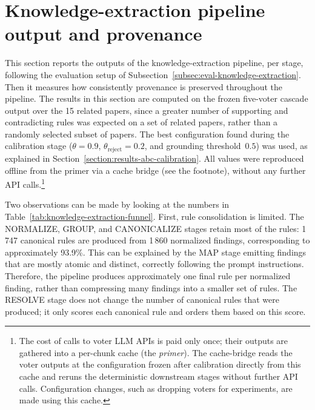 \section{Knowledge-extraction pipeline output and provenance}\label{section:results-ke-pipeline-output-and-provenance}

This section reports the outputs of the knowledge-extraction pipeline, per stage, following the evaluation setup of Subsection~\ref{subsec:eval-knowledge-extraction}. Then it measures how consistently provenance is preserved throughout the pipeline. The results in this section are computed on the frozen five-voter cascade output over the 15 related papers, since a greater number of supporting and contradicting rules was expected on a set of related papers, rather than a randomly selected subset of papers. The best configuration found during the calibration stage ($\theta = 0.9$, $\theta_{\mathrm{reject}} = 0.2$, and grounding threshold~$0.5$) was used, as explained in Section~\ref{section:results-abc-calibration}. All values were reproduced offline from the primer via a cache bridge (see the footnote), without any further API calls.\footnote{
The cost of calls to voter LLM APIs is paid only once; their outputs are gathered into a per-chunk cache (the \emph{primer}). The cache-bridge reads the voter outputs at the configuration frozen after calibration directly from this cache and reruns the deterministic downstream stages without further API calls. Configuration changes, such as dropping voters for experiments, are made using this cache.}

Two observations can be made by looking at the numbers in Table~\ref{tab:knowledge-extraction-funnel}. First, rule consolidation is limited. The NORMALIZE, GROUP, and CANONICALIZE stages retain most of the rules: 1\,747 canonical rules are produced from 1\,860 normalized findings, corresponding to approximately 93.9\%. This can be explained by the MAP stage emitting findings that are mostly atomic and distinct, correctly following the prompt instructions. Therefore, the pipeline produces approximately one final rule per normalized finding, rather than compressing many findings into a smaller set of rules. The RESOLVE stage does not change the number of canonical rules that were produced; it only scores each canonical rule and orders them based on this score.

